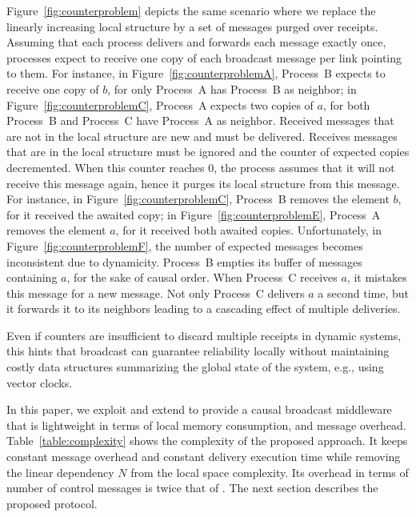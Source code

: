 Figure~\ref{fig:counterproblem} depicts the same scenario where we replace the
linearly increasing local structure by a set of messages purged over
receipts. Assuming that each process delivers and forwards each message exactly
once, processes expect to receive one copy of each broadcast message per link
pointing to them. For instance, in Figure~\ref{fig:counterproblemA}, Process~B
expects to receive one copy of $b$, for only Process~A has Process~B as
neighbor; in Figure~\ref{fig:counterproblemC}, Process~A expects two copies of
$a$, for both Process~B and Process~C have Process~A as neighbor. Received
messages that are not in the local structure are new and must be
delivered. Receives messages that are in the local structure must be ignored and
the counter of expected copies decremented. When this counter reaches 0, the
process assumes that it will not receive this message again, hence it purges its
local structure from this message. For instance, in
Figure~\ref{fig:counterproblemC}, Process~B removes the element $b$, for it
received the awaited copy; in Figure~\ref{fig:counterproblemE}, Process~A
removes the element $a$, for it received both awaited copies.  Unfortunately, in
Figure~\ref{fig:counterproblemF}, the number of expected messages becomes
inconsistent due to dynamicity. Process~B empties its buffer of messages
containing $a$, for the sake of causal order. When Process~C receives $a$, it
mistakes this message for a new message. Not only Process~C delivers $a$ a
second time, but it forwards it to its neighbors leading to a cascading effect
of multiple deliveries.


Even if counters are insufficient to discard multiple receipts in dynamic
systems, this hints that broadcast can guarantee reliability locally without
maintaining costly data structures summarizing the global state of the system,
e.g., using vector clocks.




In this paper, we exploit and extend \PCBROADCAST to provide a causal broadcast
middleware that is lightweight in terms of local memory consumption, and message
overhead. Table~\ref{table:complexity} shows the complexity of the proposed
approach. It keeps constant message overhead and constant delivery execution
time while removing the linear dependency $N$ from the local space
complexity. Its overhead in terms of number of control messages is twice that of
\PCBROADCAST.
The next section describes the proposed protocol.


